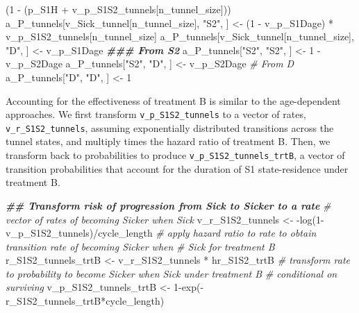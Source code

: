 \documentclass[
]{article}
\newenvironment{Shaded}{\begin{snugshade}}{\end{snugshade}}
\newcommand{\CommentTok}[1]{\textcolor[rgb]{0.56,0.35,0.01}{\textit{#1}}}
\newcommand{\DecValTok}[1]{\textcolor[rgb]{0.00,0.00,0.81}{#1}}
\newcommand{\DocumentationTok}[1]{\textcolor[rgb]{0.56,0.35,0.01}{\textbf{\textit{#1}}}}
\newcommand{\FunctionTok}[1]{\textcolor[rgb]{0.00,0.00,0.00}{#1}}
\newcommand{\NormalTok}[1]{#1}
\newcommand{\OtherTok}[1]{\textcolor[rgb]{0.56,0.35,0.01}{#1}}
\newcommand{\SpecialCharTok}[1]{\textcolor[rgb]{0.00,0.00,0.00}{#1}}
\newcommand{\StringTok}[1]{\textcolor[rgb]{0.31,0.60,0.02}{#1}}
\begin{document}
\begin{Shaded}
\begin{Highlighting}[]
\NormalTok{                                               (}\DecValTok{1} \SpecialCharTok{{-}}\NormalTok{ (p\_S1H }\SpecialCharTok{+}\NormalTok{ v\_p\_S1S2\_tunnels[n\_tunnel\_size]))}
\NormalTok{a\_P\_tunnels[v\_Sick\_tunnel[n\_tunnel\_size], }\StringTok{"S2"}\NormalTok{, ] }\OtherTok{\textless{}{-}}\NormalTok{ (}\DecValTok{1} \SpecialCharTok{{-}}\NormalTok{ v\_p\_S1Dage) }\SpecialCharTok{*} 
\NormalTok{                                                     v\_p\_S1S2\_tunnels[n\_tunnel\_size]}
\NormalTok{a\_P\_tunnels[v\_Sick\_tunnel[n\_tunnel\_size], }\StringTok{"D"}\NormalTok{, ]  }\OtherTok{\textless{}{-}}\NormalTok{ v\_p\_S1Dage}
\DocumentationTok{\#\#\# From S2}
\NormalTok{a\_P\_tunnels[}\StringTok{"S2"}\NormalTok{, }\StringTok{"S2"}\NormalTok{, ] }\OtherTok{\textless{}{-}} \DecValTok{1} \SpecialCharTok{{-}}\NormalTok{ v\_p\_S2Dage}
\NormalTok{a\_P\_tunnels[}\StringTok{"S2"}\NormalTok{, }\StringTok{"D"}\NormalTok{, ]  }\OtherTok{\textless{}{-}}\NormalTok{ v\_p\_S2Dage}
\CommentTok{\# From D}
\NormalTok{a\_P\_tunnels[}\StringTok{"D"}\NormalTok{, }\StringTok{"D"}\NormalTok{, ] }\OtherTok{\textless{}{-}} \DecValTok{1}
\end{Highlighting}
\end{Shaded}

Accounting for the effectiveness of treatment B is similar to the age-dependent approaches. We first transform \texttt{v\_p\_S1S2\_tunnels} to a vector of rates, \texttt{v\_r\_S1S2\_tunnels}, assuming exponentially distributed transitions across the tunnel states, and multiply times the hazard ratio of treatment B. Then, we transform back to probabilities to produce \texttt{v\_p\_S1S2\_tunnels\_trtB}, a vector of transition probabilities that account for the duration of S1 state-residence under treatment B.

\begin{Shaded}
\begin{Highlighting}[]
\DocumentationTok{\#\# Transform risk of progression from Sick to Sicker to a rate}
\CommentTok{\# vector of rates of becoming Sicker when Sick}
\NormalTok{v\_r\_S1S2\_tunnels }\OtherTok{\textless{}{-}} \SpecialCharTok{{-}}\FunctionTok{log}\NormalTok{(}\DecValTok{1}\SpecialCharTok{{-}}\NormalTok{v\_p\_S1S2\_tunnels)}\SpecialCharTok{/}\NormalTok{cycle\_length}
\CommentTok{\# apply hazard ratio to rate to obtain transition rate of becoming Sicker when }
\CommentTok{\# Sick for treatment B}
\NormalTok{r\_S1S2\_tunnels\_trtB }\OtherTok{\textless{}{-}}\NormalTok{ v\_r\_S1S2\_tunnels }\SpecialCharTok{*}\NormalTok{ hr\_S1S2\_trtB}
\CommentTok{\# transform rate to probability to become Sicker when Sick under treatment B }
\CommentTok{\# conditional on surviving}
\NormalTok{v\_p\_S1S2\_tunnels\_trtB }\OtherTok{\textless{}{-}} \DecValTok{1}\SpecialCharTok{{-}}\FunctionTok{exp}\NormalTok{(}\SpecialCharTok{{-}}\NormalTok{r\_S1S2\_tunnels\_trtB}\SpecialCharTok{*}\NormalTok{cycle\_length) }
\end{Highlighting}
\end{Shaded}
\end{document}
